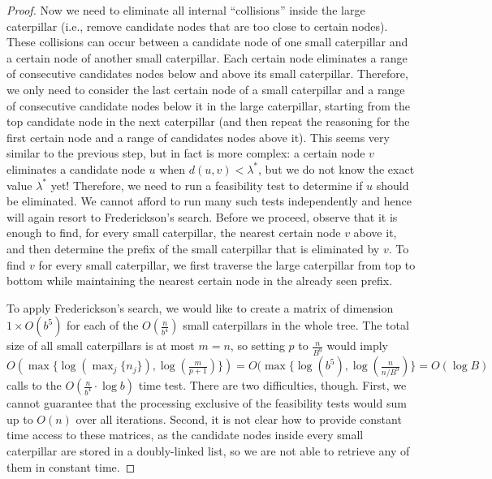 \documentclass[11pt,a4paper]{article}
\theoremstyle{definition}
\theoremstyle{remark}
\begin{document}
\begin{proof}
Now we need to eliminate all internal ``collisions'' inside the large caterpillar (i.e., remove candidate nodes that
are too close to certain nodes). These collisions can occur between a candidate node of one small caterpillar
and a certain node of another small caterpillar. Each certain node eliminates a range of consecutive
candidates nodes below and above its small caterpillar. Therefore, we only need to consider the 
last certain node of a small caterpillar and a range of consecutive candidate nodes below it in the
large caterpillar, starting from the top candidate node in the next caterpillar (and then repeat
the reasoning for the first certain node and a range of candidates nodes above it). This seems very similar
to the previous step, but in fact is more complex: a certain node $v$ eliminates a candidate node $u$ when
$d(u,v)<\lambda^{*}$, but we do not know the exact value $\lambda^{*}$ yet! Therefore, we need to run
a feasibility test to determine if $u$ should be eliminated. We cannot afford to run many such tests
independently and hence will again resort to Frederickson's search. Before we proceed, observe that
it is enough to find, for every small caterpillar, the nearest certain node $v$ above it, and then determine
the prefix of the small caterpillar that is eliminated by $v$. To find $v$ for every small caterpillar,
we first traverse the large caterpillar from top to bottom while maintaining the nearest certain node
in the already seen prefix.

To apply Frederickson's search, we would like to create a matrix of dimension $1\times O(b^{5})$
for each of the $O(\frac{n}{b^{4}})$ small caterpillars in the whole tree. The total size of all small
caterpillars is at most $m=n$, so setting $p$ to $\frac{n}{B^9}$ would imply
$O(\max \lbrace \log(\max_{j} \lbrace n_j \rbrace), \log(\frac{m}{p+1}) \rbrace) = O(\max \lbrace \log (b^{5}), \log(\frac{n}{n/B^{9}}) \rbrace = O(\log B)$ calls to the $O(\frac{n}{b^{4}} \cdot \log b)$ time test.
There are two difficulties, though. First, we cannot guarantee that the processing exclusive of the feasibility tests
would sum up to $O(n)$ over all iterations. Second, it is not clear how to provide constant time access
to these matrices, as the candidate nodes inside every small caterpillar are stored in a doubly-linked list,
so we are not able to retrieve any of them in constant time. 



\end{proof}
\end{document}
